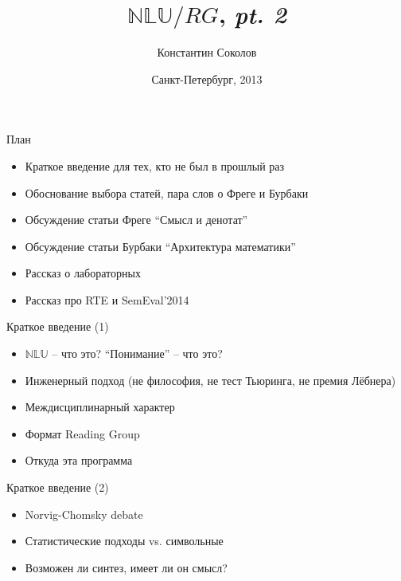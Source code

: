 \documentclass{beamer}
\begin{document}
\title{\huge{$\mathbb{NLU}/RG$, \textit{pt. 2}}}
\author{Константин Соколов}
\date{Санкт-Петербург, 2013} 
\begin{frame}
    \thispagestyle{empty}
    \titlepage
\end{frame}



\begin{frame}{План}
    \setcounter{framenumber}{1}
    \begin{itemize}
        \item Краткое введение для тех, кто не был в прошлый раз
        \item Обоснование выбора статей, пара слов о Фреге и Бурбаки
        \item Обсуждение статьи Фреге ``Смысл и денотат''
        \item Обсуждение статьи Бурбаки ``Архитектура математики''
        \item Рассказ о лабораторных
        \item Рассказ про RTE и SemEval'2014
    \end{itemize}
\end{frame}

\begin{frame}{Краткое введение (1)}
    \begin{itemize}
        \item $\mathbb{NLU}$ -- что это? ``Понимание'' -- что это?
        \item Инженерный подход (не философия, не тест Тьюринга, не премия Лёбнера)
        \item Междисциплинарный характер
        \item Формат Reading Group
        \item Откуда эта программа
    \end{itemize}
\end{frame}

\begin{frame}{Краткое введение (2)}
    \begin{itemize}
        \item Norvig-Chomsky debate
        \item Статистические подходы vs. символьные
        \item Возможен ли синтез, имеет ли он смысл?
    \end{itemize}
\end{frame}
\end{document}

